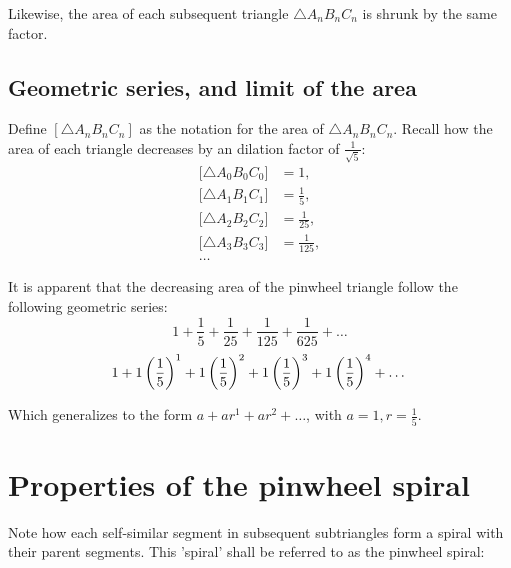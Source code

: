 \noindent
Likewise, the area of each subsequent triangle $\triangle A_{n}B_{n}C_{n}$ is shrunk by the same factor.

\subsection{Geometric series, and limit of the area}
Define $[\triangle A_{n}B_{n}C_{n}]$ as the notation for the area of $\triangle A_{n}B_{n}C_{n}$. Recall how the area of each triangle decreases by an dilation factor of $\frac{1}{\sqrt{5}}$:
\begin{equation}
    \begin{aligned}
        \big[\triangle A_{0}B_{0}C_{0}\big] &= 1,\\
        \big[\triangle A_{1}B_{1}C_{1}\big] &= \frac{1}{5},\\
        \big[\triangle A_{2}B_{2}C_{2}\big] &= \frac{1}{25},\\
        \big[\triangle A_{3}B_{3}C_{3}\big] &= \frac{1}{125},\\
        \ldots
    \end{aligned}
\end{equation}

\noindent
It is apparent that the decreasing area of the pinwheel triangle follow the following geometric series:
\begin{equation}
    1 + \frac{1}{5} + \frac{1}{25} + \frac{1}{125} + \frac{1}{625} + \ldots
\end{equation}
\begin{equation}
    1 + 1\left(\frac{1}{5}\right)^1 + 1\left(\frac{1}{5}\right)^2 + 1\left(\frac{1}{5}\right)^3 + 1\left(\frac{1}{5}\right)^4 + \ldots \\
\end{equation}

\noindent
Which generalizes to the form $a + ar^1 + ar^2 + \ldots$, with $a = 1, r = \frac{1}{5}$.

\section{Properties of the pinwheel spiral}
Note how each self-similar segment in subsequent subtriangles form a spiral with their parent segments. This 'spiral' shall be referred to as the pinwheel spiral:


